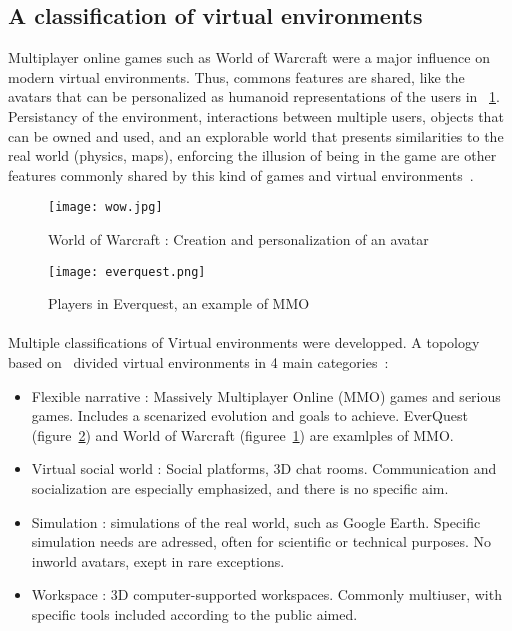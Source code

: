 \subsection{A classification of virtual environments}
Multiplayer online games such as World of Warcraft were a major influence on modern virtual environments. Thus, commons features are shared, like the avatars that can be personalized as humanoid representations of the users in ~\ref{fig:VE_wow}.
Persistancy of the environment, interactions between multiple users, objects that can be owned and used, and an explorable world that presents similarities to the real world (physics, maps), enforcing the illusion of being in the game are other features commonly shared by this kind of games and virtual environments~\cite{warburton2009second}. 

\begin{figure}[h]
  \caption{World of Warcraft : Creation and personalization of an avatar~\cite{ref_VE_wow}}
  \centering
  \texttt{[image: wow.jpg]}
  \label{fig:VE_wow}
\end{figure}

\begin{figure}[h]
  \caption{Players in Everquest, an example of MMO ~\cite{ref_VE_wow}}
  \centering
  \texttt{[image: everquest.png]}
  \label{fig:everquest}
\end{figure}

\paragraph{}
Multiple classifications of Virtual environments were developped. A topology based on~\cite{mckeown2007taking} divided virtual environments in 4 main categories~\cite{warburton2009second}:
\begin{itemize}
\item Flexible narrative : Massively Multiplayer Online (MMO) games and serious games. Includes a scenarized evolution and goals to achieve. EverQuest (figure~\ref{fig:everquest}) and World of Warcraft (figuree~\ref{fig:VE_wow}) are examlples of MMO.
\item Virtual social world : Social platforms, 3D chat rooms. Communication and socialization are especially emphasized, and there is no specific aim.
\item Simulation : simulations of the real world, such as Google Earth. Specific simulation needs are adressed, often for scientific or technical purposes. No inworld avatars, exept in rare exceptions.
\item Workspace : 3D computer-supported workspaces. Commonly multiuser, with specific tools included according to the public aimed.

\end{itemize}

